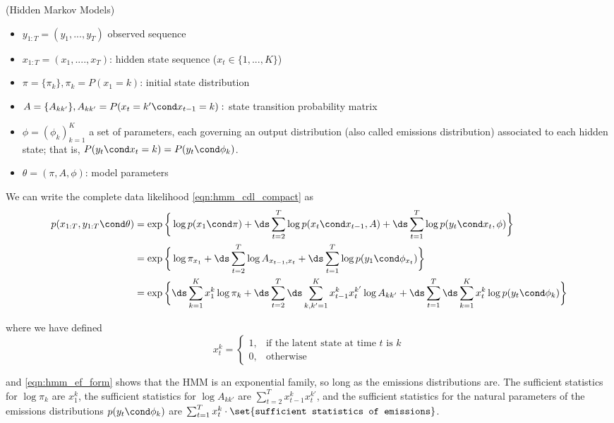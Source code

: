 \documentclass{article} %
\newcommand{\state}{x}
\begin{document}
\begin{example}{(Hidden Markov Models)}
\begin{itemize}
\item $y_{1:T}=(y_1, ..., y_T)$ observed sequence
\item $\state_{1:T} =(\state_1, ...., \state_T)$: hidden state sequence ($\state_t \in \{1,...,K \}$) 
\item $\pi = \{ \pi_k \}, \pi_k = P(\state_1 = k)$: initial state distribution
\item $A=\{A_{kk'}\}, A_{kk'} = P(\state_t= k' \cond \state_{t-1}=k):$ state transition probability matrix 
\item $\phi = (\phi_k)_{k=1}^K$ a set of parameters, each governing an output distribution (also called emissions distribution) associated to each hidden state; that is, $ P(y_t \cond \state_t=k) = P(y_t \cond \phi_k)$. 
\item $\theta = (\pi, A, \phi)$: model parameters
\end{itemize}


We can write the complete data likelihood \eqref{eqn:hmm_cdl_compact} as
\begin{align}
p(\state_{1:T}, y_{1:T} \cond \theta) &=  \exp\bigg \{ \log p(\state_1 \cond \pi) + \ds\sum_{t=2}^T \log p(\state_t \cond \state_{t-1}, A) +  \ds\sum_{t=1}^T \log p(y_t \cond \state_t, \phi) \bigg\}  \nonumber \\
&= \exp \bigg \{ \log \pi_{\state_1}  + \ds\sum_{t=2}^T \log A_{\state_{t-1}, \state_t} + \ds\sum_{t=1}^T \log p(y_1 \cond \phi_{\state_t}) \bigg\} \nonumber \\
&=  \exp\bigg \{  \ds\sum_{k=1}^K \state_1^k \log \pi_k + \ds\sum_{t=2}^T \ds\sum_{k, k'=1}^K \state_{t-1}^k \state_t^{k'} \log A_{kk'} + \ds\sum_{t=1}^T \ds\sum_{k=1}^K \state_t^k \log p(y_t \cond \phi_k)  \bigg\} \label{eqn:hmm_ef_form}
\end{align}

where we have defined
\[ \state_t^k =  
\begin{cases}	  
1, & \text{if the latent state at time $t$ is $k$} \\
0, & \text{otherwise}
\end{cases} \]

and \eqref{eqn:hmm_ef_form} shows that the HMM is an exponential family, so long as the emissions distributions are. 
The sufficient statistics for $\log \pi_k$ are $\state_1^k$, the sufficient statistics for $\log A_{kk'}$ are $\sum_{t=2}^T \state_{t-1}^k \state_t^{k'}$, and the sufficient statistics for the natural parameters of the emissions distributions $p(y_t \cond \phi_k)$ are  $\sum_{t=1}^T \state_{t}^k \cdot \set{\texttt{sufficient statistics of emissions}}$.

\end{example}
\end{document}
